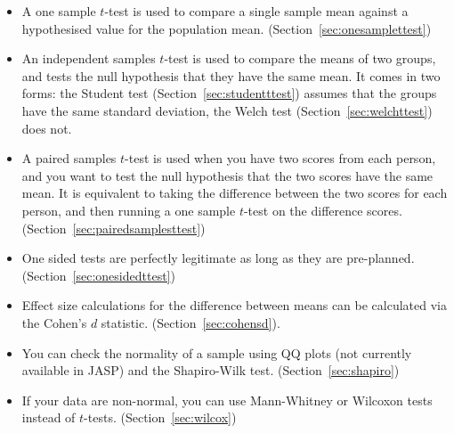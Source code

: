 \begin{itemize} \itemsep -2pt
\item A one sample $t$-test is used to compare a single sample mean against a hypothesised value for the population mean. (Section~\ref{sec:onesamplettest})
\item An independent samples $t$-test is used to compare the means of two groups, and tests the null hypothesis that they have the same mean. It comes in two forms: the Student test (Section~\ref{sec:studentttest}) assumes that the groups have the same standard deviation, the Welch test (Section~\ref{sec:welchttest}) does not.
\item A paired samples $t$-test is used when you have two scores from each person, and you want to test the null hypothesis that the two scores have the same mean. It is equivalent to taking the difference between the two scores for each person, and then running a one sample $t$-test on the difference scores. (Section~\ref{sec:pairedsamplesttest})
\item One sided tests are perfectly legitimate as long as they are pre-planned. (Section~\ref{sec:onesidedttest})
\item Effect size calculations for the difference between means can be calculated via the Cohen's $d$ statistic. (Section~\ref{sec:cohensd}).
\item You can check the normality of a sample using QQ plots (not currently available in JASP) and the Shapiro-Wilk test. (Section~\ref{sec:shapiro})
\item If your data are non-normal, you can use Mann-Whitney or Wilcoxon tests instead of $t$-tests. (Section~\ref{sec:wilcox})
\end{itemize}








